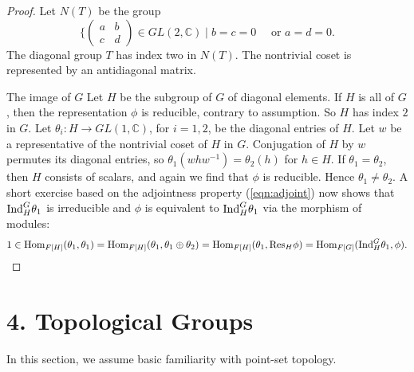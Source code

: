 \documentclass{llncs}
\def\op#1{{\hbox{#1}}}
\newcommand{\ring}[1]{\mathbb{#1}}
\begin{document}
\begin{proof}
Let $N(T)$ be the group 
\[
\{\begin{pmatrix} a & b \\ c & d\end{pmatrix} \in GL(2,\ring{C}) \mid
b = c =0 \quad \text{ or } a = d = 0.
\]
The diagonal group $T$ has index two in $N(T)$.
The nontrivial coset is represented by an  antidiagonal matrix.

The image of $G$ Let $H$ be the subgroup of $G$ of diagonal elements.
If $H$ is all of $G$, then the representation $\phi$ is reducible,
contrary to assumption.  So $H$ has index $2$ in $G$.  Let
$\theta_i:H\to GL(1,\ring{C})$, for $i=1,2$, be the diagonal entries
of $H$.  Let $w$ be a representative of the nontrivial coset of $H$ in
$G$.  Conjugation of $H$ by $w$ permutes its diagonal entries, so
$\theta_1(w h w^{-1}) = \theta_2(h)$ for $h\in H$.  If
$\theta_1=\theta_2$, then $H$ consists of scalars, and again we find
that $\phi$ is reducible.  Hence $\theta_1\ne\theta_2$.  A short
exercise based on the adjointness property (\ref{eqn:adjoint}) now
shows that $\op{Ind}_H^G\theta_1$ is irreducible and $\phi$ is
equivalent to $\op{Ind}_H^G\theta_1$ via the morphism of modules:
\[
1\in\op{Hom}_{F[H]}(\theta_1,\theta_1)=\op{Hom}_{F[H]}(\theta_1,\theta_1\oplus\theta_2)=
\op{Hom}_{F[H]}(\theta_1,\op{Res}_H\phi) = \op{Hom}_{F[G]}(\op{Ind}_H^G\theta_1,\phi).
\]
\end{proof}

\section{4.  Topological Groups}

In this section, we assume basic familiarity with point-set topology.






\raggedright


\end{document}
